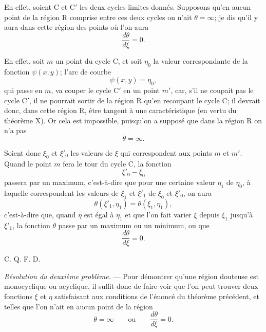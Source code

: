 \documentclass[11pt]{article}
\begin{document}
En effet, soient C et C$'$ les deux cycles limites donnés. Supposons qu’en aucun point de la région R comprise entre ces deux cycles on n’ait $\theta=\infty$; je dis qu’il y aura dans cette région des points où l’on aura
\[
\frac{d\theta}{d\xi}=0.
\]

En effet, soit $m$ un point du cycle C, et soit $\eta_0$ la valeur correspondante de la fonction $\psi(x,y)$; l’arc de courbe
\[
\psi(x,y)=\eta_0,
\]
qui passe en $m$, va couper le cycle C$'$ en un point $m'$, car, s’il ne coupait pas le cycle C$'$, il ne pourrait sortir de la région R qu’en recoupant le cycle C; il devrait donc, dans cette région R, être tangent à une caractéristique (en vertu du théorème X). Or cela est impossible, puisqu’on a supposé que dans la région R on n’a pas
\[
\theta=\infty.
\]

Soient donc $\xi_0$ et $\xi'_0$ les valeurs de $\xi$ qui correspondent aux points $m$ et $m'$. Quand le point $m$ fera le tour du cycle C, la fonction
\[
\xi'_0-\xi_0
\]
passera par un maximum, c’est-à-dire que pour une certaine valeur $\eta_1$ de $\eta_0$, à laquelle correspondent les valeurs de $\xi_1$ et $\xi'_1$ de $\xi_0$ et $\xi'_0$, on aura
\[
\theta(\xi'_1,\eta_1)=\theta(\xi_1,\eta_1),
\]
c’est-à-dire que, quand $\eta$ est égal à $\eta_1$ et que l’on fait varier $\xi$ depuis $\xi_1$ jusqu’à $\xi'_1$, la fonction $\theta$ passe par un maximum ou un minimum, ou que
\[
\frac{d\theta}{d\xi}=0.
\]
\begin{flushright}C. Q. F. D.\end{flushright}

\emph{Résolution du deuxième problème.} --- Pour démontrer qu’une région douteuse est monocyclique ou acyclique, il suffit donc de faire voir que l’on peut trouver deux fonctions $\xi$ et $\eta$ satisfaisant aux conditions de l’énoncé du théorème précédent, et telles que l’on n’ait en aucun point de la région
\[
\theta=\infty
\qquad\text{ou}\qquad
\frac{d\theta}{d\xi}=0.
\]
\end{document}
